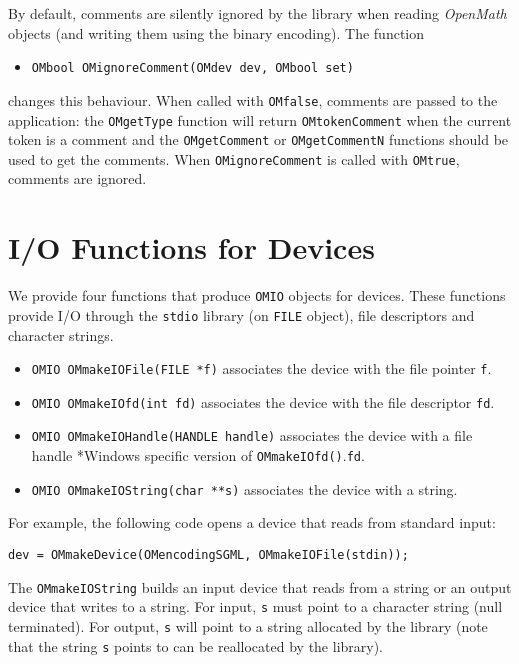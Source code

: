 \documentclass{article}
\newcommand{\OM}{{\sl OpenMath}}
\begin{document}
By default, comments are silently ignored by the library when reading {\OM}
objects (and writing them using the binary encoding).
The function 
\begin{itemize} 
\item \verb+OMbool OMignoreComment(OMdev dev, OMbool set)+
\end{itemize} 
changes this behaviour. When called with {\tt OMfalse}, comments are passed
to the application: the {\tt OMgetType} function will return
{\tt OMtokenComment} when the current token is a comment and the 
{\tt OMgetComment} or {\tt OMgetCommentN} functions should be used to get the
comments. When {\tt OMignoreComment} is called with {\tt OMtrue}, comments
are ignored.

\section{I/O Functions for Devices}
\label{io}

We provide four functions that produce {\tt OMIO}
objects for devices. These functions provide I/O through the {\tt stdio}
library (on {\tt FILE} object), file descriptors and character strings. 

\begin{itemize} 
\item \verb+OMIO OMmakeIOFile(FILE *f)+ associates the device with the
file pointer {\tt f}.
\item \verb+OMIO OMmakeIOfd(int fd)+ associates the device with the file
descriptor {\tt fd}.
\item \verb+OMIO OMmakeIOHandle(HANDLE handle)+ associates the device with a file handle *Windows specific version of \verb+OMmakeIOfd()+.{\tt fd}.
\item \verb+OMIO OMmakeIOString(char **s)+  associates the device with a string.
\end{itemize} 
For example, the following code opens a device that reads from standard
input: 
\begin{verbatim} 
dev = OMmakeDevice(OMencodingSGML, OMmakeIOFile(stdin));
\end{verbatim} 

The {\tt OMmakeIOString} builds an input device that reads from a string
or an output device that writes to a string. For input, {\tt s} must point to
a character string (null terminated). For output, {\tt s} will point to a
string allocated by the library (note that the string {\tt s} points to can
be reallocated by the library).
\end{document}
